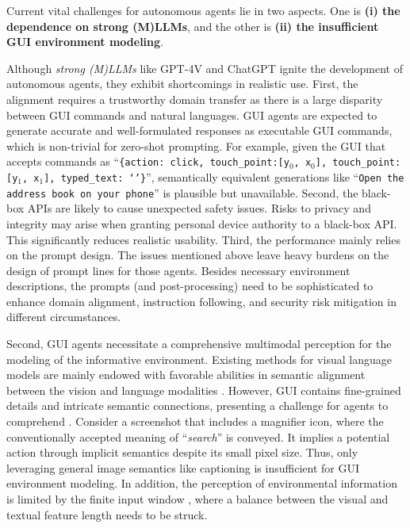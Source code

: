 Current vital challenges for autonomous agents lie in two aspects. One is \textbf{(i) the dependence on strong (M)LLMs}, and the other is \textbf{(ii) the insufficient GUI environment modeling}.

Although \textit{strong (M)LLMs} like GPT-4V \cite{openai2023gpt4} and ChatGPT \cite{ouyang2022training} ignite the development of autonomous agents, they exhibit shortcomings in realistic use.
First, the alignment requires a trustworthy domain transfer as there is a large disparity between GUI commands and natural languages. 
GUI agents are expected to generate accurate and well-formulated responses as executable GUI commands, which is non-trivial for zero-shot prompting.
For example, given the GUI that accepts commands as ``\texttt{\{action: click, touch\_point:[y$_0$, x$_0$], touch\_point:[y$_1$, x$_1$], typed\_text: `'\}}'', semantically equivalent generations like ``\texttt{Open the address book on your phone}'' is plausible but unavailable.
Second, the black-box APIs are likely to cause unexpected safety issues.
Risks to privacy and integrity may arise when granting personal device authority to a black-box API.
This significantly reduces realistic usability.
Third, the performance mainly relies on the prompt design.
The issues mentioned above leave heavy burdens on the design of prompt lines for those agents.
Besides necessary environment descriptions, the prompts (and post-processing) need to be sophisticated to enhance domain alignment, instruction following, and security risk mitigation in different circumstances.

Second, GUI agents necessitate a comprehensive multimodal perception for the modeling of the informative environment.
Existing methods for visual language models are mainly endowed with favorable abilities in semantic alignment between the vision and language modalities \cite{instructblip, ye2023mplugowl, zhao2023mmicl}. 
However, GUI contains fine-grained details and intricate semantic connections, presenting a challenge for agents to comprehend \cite{rawles2023android, li2023otterhd}. 
Consider a screenshot that includes a magnifier icon, where the conventionally accepted meaning of ``\textit{search}'' is conveyed. It implies a potential action through implicit semantics despite its small pixel size.
Thus, only leveraging general image semantics like captioning is insufficient for GUI environment modeling.
In addition, the perception of environmental information is limited by the finite input window
, where a balance between the visual and textual feature length needs to be struck. 

